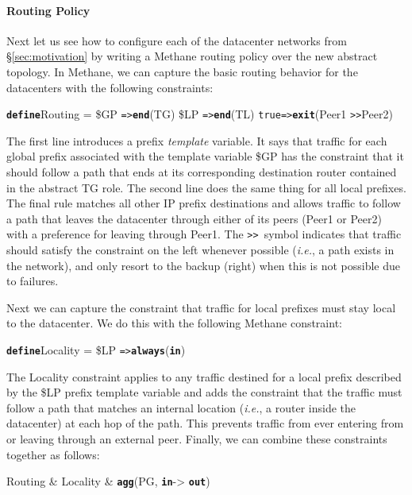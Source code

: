 \documentclass{sig-alternate-10pt}
\newcommand{\IE}{\emph{i.e.}}
\newcommand{\sysname}{{\small \sf Methane}\xspace}
\newcommand{\para}[1]{\paragraph*{\textbf{#1}}}
\newcommand{\CD}[1]{\texttt{\small #1}}  %
\newcommand{\KW}[1]{\texttt{\small\bfseries{#1}}}
\newcommand{\True}{\CD{true}}
\newcommand{\Define}{\KW{define}}
\newcommand{\Prefer}{\texttt{>>}}
\newcommand{\Path}{\texttt{=>}}
\newcommand{\Agg}{\KW{agg}}
\newcommand{\In}{\KW{in}}
\newcommand{\Out}{\KW{out}}
\newcommand{\Exit}{\KW{exit}}
\newcommand{\End}{\KW{end}}
\newcommand{\Always}{\KW{always}}
\begin{document}

\para{Routing Policy}

Next let us see how to configure each of the datacenter networks from \S\ref{sec:motivation} by writing a \sysname routing policy over the new abstract topology. In \sysname, we can capture the basic routing behavior for the datacenters with the following constraints:
%
\begin{code}
\Define Routing =
    \$GP  \Path \End(TG)
    \$LP  \Path \End(TL)
    \True \Path \Exit(Peer1 \Prefer Peer2)
\end{code}
\noindent%

The first line introduces a prefix \emph{template} variable. It says that traffic for each global prefix associated with the template variable \$GP has the constraint that it should follow a path that ends at its corresponding destination router contained in the abstract TG role. The second line does the same thing for all local prefixes.
%
The final rule matches all other IP prefix destinations and allows traffic to follow a path that leaves the datacenter through either of its peers (Peer1 or Peer2) with a preference for leaving through Peer1. The \Prefer~symbol indicates that traffic should satisfy the constraint on the left whenever possible (\IE, a path exists in the network), and only resort to the backup (right) when this is not possible due to failures.%

Next we can capture the constraint that traffic for local prefixes must stay local to the datacenter.
We do this with the following \sysname constraint:
%
\begin{code}
\Define Locality =
    \$LP \Path \Always(\In)
\end{code}
\noindent%
%
The Locality constraint applies to any traffic destined for a local prefix described by the \$LP prefix template variable and adds the constraint that the traffic must follow a path that matches an internal location (\IE, a router inside the datacenter) at each hop of the path. This prevents traffic from ever entering from or leaving through an external peer. Finally, we can combine these constraints together as follows:

\begin{code}
Routing & Locality & \Agg(PG, \In -> \Out)
\end{code}
\noindent%
\end{document}
